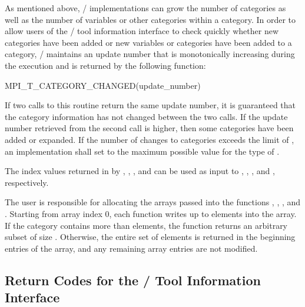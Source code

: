 As mentioned above, \MPI/ implementations can grow the number of categories
as well as the number of variables or other categories within a category.
In order to allow users of the \MPI/ tool information interface to check
quickly whether new categories have been added or new variables or
categories have been added to a category, \MPI/ maintains an update number
that is monotonically increasing during the execution
and is returned by the following function:

\label{sec:mpit:category_changed}
\begin{funcdef}{MPI\_T\_CATEGORY\_CHANGED}{(\mbox{update\_number})}
\end{funcdef}

If two calls to this routine return the same update number, it is
guaranteed that the category information has not changed between the two
calls.  If the update number retrieved from the second call is higher, then
some categories have been added or expanded. If the number of changes to
categories exceeds the limit of , an implementation
shall set  to the maximum possible value for the type of .

The index values returned in  by
,
,
, and
 can be used as input to
, ,
, and
, respectively.

The user is responsible for allocating the arrays passed into the functions
,
,
, and
.  Starting from array index
$0$, each function writes up to  elements into the array.  If
the category contains more than  elements, the function returns
an arbitrary subset of size .  Otherwise, the entire set of elements is
returned in the beginning entries of the array, and any remaining array
entries are not modified.

\subsection{Return Codes for the \texorpdfstring{\MPI/}{MPI} Tool Information Interface}
\label{sec:mpit:retcodes}

